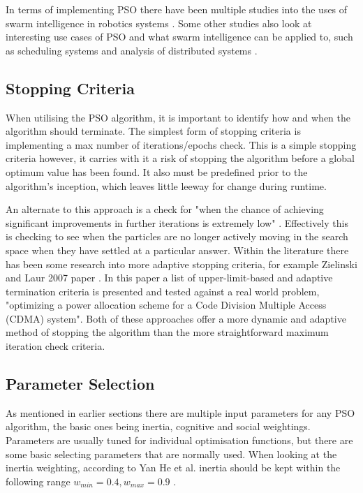 \documentclass[oneside,12pt]{book}
\begin{document}
In terms of implementing PSO there have been multiple studies into the uses of swarm intelligence in robotics systems \cite{sa_nedjah_mourelle_2016, meng_gan_2008, hereford_2006}. Some other studies also look at interesting use cases of PSO and what swarm intelligence can be applied to, such as scheduling systems and analysis of distributed systems \cite{li_yang_su_lu_yu_2019, moradi_fotuhi-firuzabad_2008, nouiri_bekrar_jemai_niar_ammari_2015, sahin2007fault}. 

\subsection{Stopping Criteria}
When utilising the PSO algorithm, it is important to identify how and when the algorithm should terminate. The simplest form of stopping criteria is implementing a max number of iterations/epochs check. This is a simple stopping criteria however, it carries with it a risk of stopping the algorithm before a global optimum value has been found. It also must be predefined prior to the algorithm's inception, which leaves little leeway for change during runtime.

An alternate to this approach is a check for "when the chance of achieving significant improvements in further iterations is extremely low" \cite{bassimir2020self}. Effectively this is checking to see when the particles are no longer actively moving in the search space when they have settled at a particular answer. Within the literature there has been some research into more adaptive stopping criteria, for example Zielinski and Laur 2007 paper \cite{zielinski2007stopping}. In this paper a list of upper-limit-based and adaptive termination criteria is presented and tested against a real world problem, "optimizing a power allocation scheme for a Code Division Multiple Access (CDMA) system"\cite{zielinski2007stopping}. Both of these approaches offer a more dynamic and adaptive method of stopping the algorithm than the more straightforward maximum iteration check criteria. 

\subsection{Parameter Selection}
As mentioned in earlier sections there are multiple input parameters for any PSO algorithm, the basic ones being inertia, cognitive and social weightings. Parameters are usually tuned for individual optimisation functions, but there are some basic selecting parameters that are normally used. When looking at the inertia weighting, according to Yan He et al. inertia should be kept within the following range \(w_{min} = 0.4, w_{max} = 0.9\) \cite{he2016parameters}.
\end{document}
